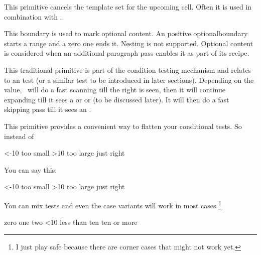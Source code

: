 \stopnewprimitive

\startoldprimitive[title={\prm {omit}}]

This primitive cancels the template set for the upcoming cell. Often it is used
in combination with .

\stopoldprimitive

\startnewprimitive[title={\prm {optionalboundary}}]

This boundary is used to mark optional content. An positive \prm
{optionalboundary} starts a range and a zero one ends it. Nesting is not
supported. Optional content is considered when an additional paragraph pass
enables it as part of its recipe.

\stopnewprimitive


\startoldprimitive[title={\prm {or}}]

This traditional primitive is part of the condition testing mechanism and relates
to an  test (or a similar test to be introduced in later
sections). Depending on the value, \TEX\ will do a fast scanning till the right
 is seen, then it will continue expanding till it sees a 
or  or  (to be discussed later). It will then do a
fast skipping pass till it sees an .

\stopoldprimitive

\startnewprimitive[title={\prm {orelse}}]

This primitive provides a convenient way to flatten your conditional tests. So
instead of

\starttyping
\ifnum\scratchcounter<-10
    too small
\else\ifnum\scratchcounter>10
    too large
\else
    just right
\fi\fi
\stoptyping

You can say this:

\starttyping
\ifnum\scratchcounter<-10
    too small
\orelse\ifnum\scratchcounter>10
    too large
\else
    just right
\fi
\stoptyping

You can mix tests and even the case variants will work in most cases \footnote {I
just play safe because there are corner cases that might not work yet.}

\starttyping
\ifcase\scratchcounter          zero
\or                             one
\or                             two
\orelse\ifnum\scratchcounter<10 less than ten
\else                           ten or more
\fi
\stoptyping

